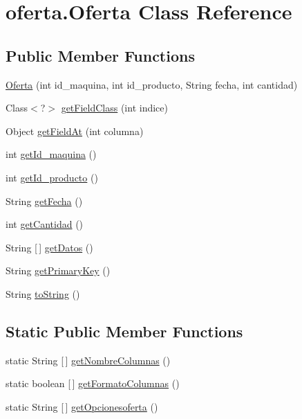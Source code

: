 \hypertarget{classoferta_1_1_oferta}{}\section{oferta.\+Oferta Class Reference}
\label{classoferta_1_1_oferta}
\subsection*{Public Member Functions}
\begin{DoxyCompactItemize}
\item 
\mbox{\hyperlink{classoferta_1_1_oferta_a84b5680354984d66e01ec12401e14b66}{Oferta}} (int id\+\_\+maquina, int id\+\_\+producto, String fecha, int cantidad)
\item 
Class$<$?$>$ \mbox{\hyperlink{classoferta_1_1_oferta_ad86745793087dca9bce627f40db9e3db}{get\+Field\+Class}} (int indice)
\item 
Object \mbox{\hyperlink{classoferta_1_1_oferta_a9e5faa568e05867cf20972dd64a02838}{get\+Field\+At}} (int columna)
\item 
int \mbox{\hyperlink{classoferta_1_1_oferta_a1da8cf2d56690b843a8361c637352a23}{get\+Id\+\_\+maquina}} ()
\item 
int \mbox{\hyperlink{classoferta_1_1_oferta_a61489be4622a79a222570257a4921243}{get\+Id\+\_\+producto}} ()
\item 
String \mbox{\hyperlink{classoferta_1_1_oferta_a431cf8c490fc904d8c280f597e343b65}{get\+Fecha}} ()
\item 
int \mbox{\hyperlink{classoferta_1_1_oferta_ab3e7bf6e9d7ba7ceaa71dcd1edb6f753}{get\+Cantidad}} ()
\item 
String \mbox{[}$\,$\mbox{]} \mbox{\hyperlink{classoferta_1_1_oferta_ab7e97fc4914cdd00e07b36a944170e3b}{get\+Datos}} ()
\item 
String \mbox{\hyperlink{classoferta_1_1_oferta_a57a753a0bc4b862e6ea347320b25540e}{get\+Primary\+Key}} ()
\item 
String \mbox{\hyperlink{classoferta_1_1_oferta_af4be574b1f0db93797a0a2fea7db2b07}{to\+String}} ()
\end{DoxyCompactItemize}
\subsection*{Static Public Member Functions}
\begin{DoxyCompactItemize}
\item 
static String \mbox{[}$\,$\mbox{]} \mbox{\hyperlink{classoferta_1_1_oferta_ab75e7ee84db370fdb8f5fcb4ea63e405}{get\+Nombre\+Columnas}} ()
\item 
static boolean \mbox{[}$\,$\mbox{]} \mbox{\hyperlink{classoferta_1_1_oferta_aa069a89096c9621c3cc1b17b72b09d27}{get\+Formato\+Columnas}} ()
\item 
static String \mbox{[}$\,$\mbox{]} \mbox{\hyperlink{classoferta_1_1_oferta_a7c159e3fdec5eedb27c557e82611a67e}{get\+Opcionesoferta}} ()
\end{DoxyCompactItemize}


